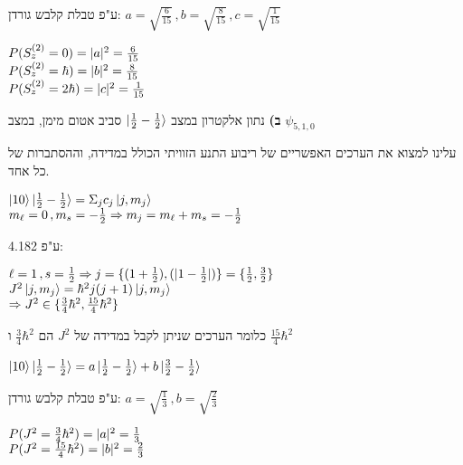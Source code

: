 \documentclass[14pt]{extarticle}
\makeatletter
\newenvironment{lefteqs}{%
    \begin{english}%
    \begin{flushleft}%
    \renewcommand{\arraystretch}{1.3}%
    $\begin{array}{@{}l@{}}%
}{%
    \end{array}$%
    \end{flushleft}%
    \end{english}%
}
\makeatother
\begin{document}
ע"פ טבלת קלבש גורדן: $a=\sqrt{\frac{6}{15}} \, , b=\sqrt{\frac{8}{15}} \, , c=\sqrt{\frac{1}{15}}$

\begin{lefteqs}
    P(S_z^{(2)}=0) = |a|^2 = \frac{6}{15} \\
    P(S_z^{(2)}=\hbar) = |b|^2 = \frac{8}{15} \\
    P(S_z^{(2)}=2\hbar) = |c|^2 = \frac{1}{15}
\end{lefteqs}

\textbf{ב)}
נתון אלקטרון במצב $\ket{\frac{1}{2} -\frac{1}{2}}$ סביב אטום מימן, במצב $\psi_{5,1,0}$

עלינו למצוא את הערכים האפשריים של ריבוע התנע הזוויתי הכולל במדידה, וההסתברות של כל אחד.

\begin{lefteqs}
    \ket{1 0} \ket{\frac{1}{2} -\frac{1}{2}} = \Sigma_j c_j \ket{j, m_j} \\
    m_{\ell} = 0 \, , m_s = -\frac{1}{2} \Rightarrow m_j = m_\ell + m_s = -\frac{1}{2} \\
\end{lefteqs}

ע"פ 4.182:

\begin{lefteqs}
    \ell = 1 \, , s=\frac{1}{2} \Rightarrow j=\{ (1+\frac{1}{2}), (|1-\frac{1}{2}|) \} = \{\frac{1}{2}, \frac{3}{2} \} \\
    J^2 \ket{j, m_j} = \hbar^2 j(j+1) \ket{j, m_j} \\
    \Rightarrow J^2 \in \{ \frac{3}{4}\hbar^2, \frac{15}{4}\hbar^2 \}
\end{lefteqs}

כלומר הערכים שניתן לקבל במדידה של $J^2$ הם $\frac{3}{4}\hbar^2$ ו $\frac{15}{4}\hbar^2$

\begin{lefteqs}
    \ket{1 0} \ket{\frac{1}{2} -\frac{1}{2}} = a \ket{\frac{1}{2} -\frac{1}{2}} + b \ket{\frac{3}{2} -\frac{1}{2}} \\
\end{lefteqs}

ע"פ טבלת קלבש גורדן: $a=\sqrt{\frac{1}{3}} \, , b=\sqrt{\frac{2}{3}}$

\begin{lefteqs}
    P(J^2 = \frac{3}{4}\hbar^2) = |a|^2 = \frac{1}{3} \\
    P(J^2 = \frac{15}{4}\hbar^2) = |b|^2 = \frac{2}{3}
\end{lefteqs}
\end{document}
